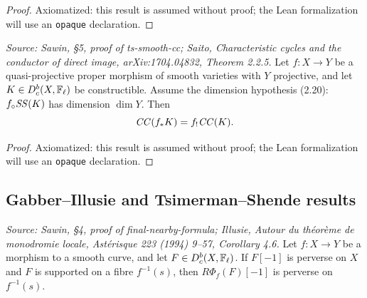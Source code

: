 \begin{proof}
  Axiomatized: this result is assumed without proof; the Lean formalization will use
  an \texttt{opaque} declaration.
\end{proof}

\begin{theorem}
  \label{thm:saito_direct_pushforward}
  \textit{Source: Sawin, §5, proof of ts-smooth-cc; Saito,
  \emph{Characteristic cycles and the conductor of direct image},
  arXiv:1704.04832, Theorem 2.2.5.}
  Let $f:X\to Y$ be a quasi-projective proper morphism of smooth varieties with $Y$
  projective, and let $K\in D^b_c(X,\mathbb{F}_\ell)$ be constructible.  Assume the
  dimension hypothesis (2.20): $f_\circ\mathit{SS}(K)$ has dimension $\dim Y$.  Then
  \[ \mathit{CC}(f_*K) = f_!\mathit{CC}(K). \]
\end{theorem}

\begin{proof}
  Axiomatized: this result is assumed without proof; the Lean formalization will use
  an \texttt{opaque} declaration.
\end{proof}

\subsection{Gabber--Illusie and Tsimerman--Shende results}

\begin{lemma}
  \label{lem:gabber_illusie}
  \textit{Source: Sawin, §4, proof of final-nearby-formula; Illusie,
  \emph{Autour du théorème de monodromie locale}, Astérisque 223 (1994) 9--57,
  Corollary 4.6.}
  Let $f:X\to Y$ be a morphism to a smooth curve, and let $F\in D^b_c(X,\mathbb{F}_\ell)$.
  If $F[-1]$ is perverse on $X$ and $F$ is supported on a fibre $f^{-1}(s)$, then
  $R\Phi_f(F)[-1]$ is perverse on $f^{-1}(s)$.
\end{lemma}

